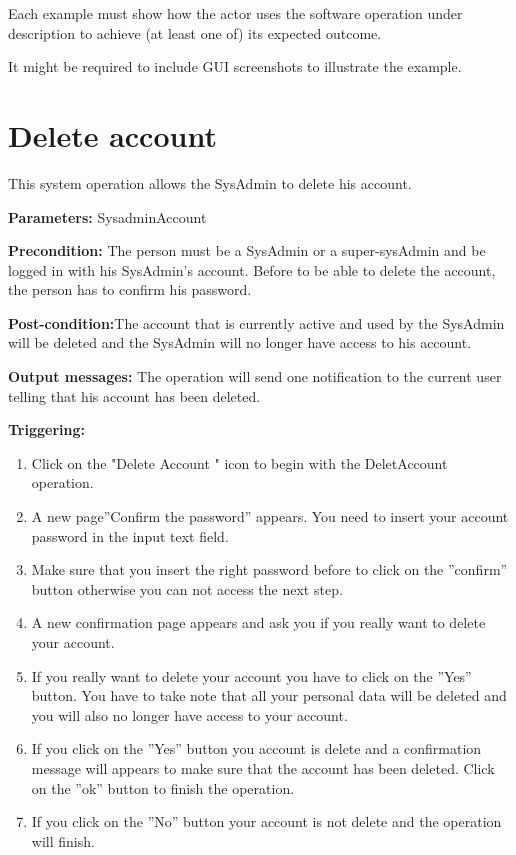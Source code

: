 Each example must show how the actor uses the software operation under
description to achieve (at least one of) its expected outcome.

It might be required to include GUI screenshots to illustrate the example.



\section{Delete account}
\label{operation:deletAccount}
This system operation allows the SysAdmin to delete his account.

\begin{description}

\item \textbf{Parameters:} SysadminAccount
\item \textbf{Precondition:} The person must be a SysAdmin or a super-sysAdmin
and be logged in with his SysAdmin's account. Before to be able to delete the
account, the person has to confirm his password.
\item \textbf{Post-condition:}The account that is currently active and used by
the SysAdmin will be deleted and the SysAdmin will no longer have access to his
account.
\item \textbf{Output messages:} The operation will send one notification to the
current user telling that his account has been deleted.


\item \textbf{Triggering:}
\begin{enumerate}
\item Click on the "Delete Account " icon to begin with the DeletAccount
operation.
\item A new page''Confirm the password'' appears. You need to insert your
account password in the input text field. 
\item Make sure that you insert the right password before to click on the
''confirm'' button otherwise you can not access the next step.
\item A new confirmation page appears and ask you if you really want to delete
your account.
\item If you really want to delete your account you have to click on the
''Yes'' button. You have to take note that all your personal data will be
deleted and you will also no longer have access to your account.
\item If you click on the ''Yes'' button you account is delete and a
confirmation message will appears to make sure that the account has been
deleted. Click on the ''ok'' button to finish the operation.
\item If you click on the ''No'' button your account is not delete and the
operation will finish.
\end{enumerate}

 
\end{description}

